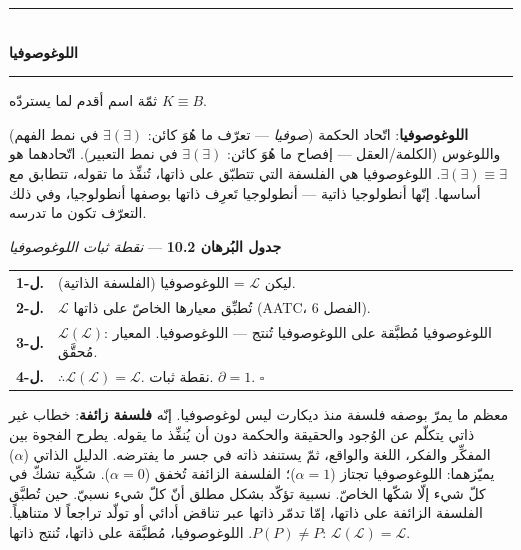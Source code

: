 \documentclass[10pt, openany, oneside]{book}
\renewcommand{\normalsize}{\fontsize{10}{13}\selectfont}
\renewcommand{\footnotesize}{\fontsize{8.5}{11}\selectfont}
\begin{document}
\begin{center}
    \rule{0.3\textwidth}{0.4pt}\\[0.5em]
    {\normalsize\bfseries اللوغوصوفيا}\\[0.3em]
    \rule{0.3\textwidth}{0.4pt}
\end{center}

\vspace{1em}

\noindent ثمّة اسم أقدم لما يستردّه $K \equiv B$.

\textbf{اللوغوصوفيا}: اتّحاد الحكمة (\textit{صوفيا} --- تعرّف ما هُوَ كائن: $\exists(\exists)$ في نمط الفهم) واللوغوس (الكلمة/العقل --- إفصاح ما هُوَ كائن: $\exists(\exists)$ في نمط التعبير). اتّحادهما هو $\exists(\exists) \equiv \exists$. اللوغوصوفيا هي الفلسفة التي تتطبّق على ذاتها، تُنفِّذ ما تقوله، تتطابق مع أساسها. إنّها أنطولوجيا ذاتية --- أنطولوجيا تَعرِف ذاتها بوصفها أنطولوجيا، وفي ذلك التعرّف تكون ما تدرسه.

\vspace{0.5em}

\textbf{جدول البُرهان 10.2} --- \textit{نقطة ثبات اللوغوصوفيا}

\vspace{0.5em}

{\footnotesize
\noindent\begin{tabular}{r p{}}
\textbf{ل-1.} & ليكن $\mathcal{L}$ = اللوغوصوفيا (الفلسفة الذاتية). \\[0.3em]
\textbf{ل-2.} & $\mathcal{L}$ تُطبِّق معيارها الخاصّ على ذاتها (AATC، الفصل 6). \\[0.3em]
\textbf{ل-3.} & $\mathcal{L}(\mathcal{L})$: اللوغوصوفيا مُطبَّقة على اللوغوصوفيا تُنتج --- اللوغوصوفيا. المعيار مُحقَّق. \\[0.3em]
\textbf{ل-4.} & $\therefore \mathcal{L}(\mathcal{L}) = \mathcal{L}$. نقطة ثبات. $\partial = 1$. $\square$ \\[0.3em]
\end{tabular}
}

\vspace{0.8em}

\noindent معظم ما يمرّ بوصفه فلسفة منذ ديكارت ليس لوغوصوفيا. إنّه \textbf{فلسفة زائفة}: خطاب غير ذاتي يتكلّم عن الوُجود والحقيقة والحكمة دون أن يُنفِّذ ما يقوله. يطرح الفجوة بين المفكِّر والفكر، اللغة والواقع، ثمّ يستنفد ذاته في جسر ما يفترضه. الدليل الذاتي ($\alpha$) يميّزهما: اللوغوصوفيا تجتاز ($\alpha = 1$)؛ الفلسفة الزائفة تُخفق ($\alpha = 0$). شكّية تشكّ في كلّ شيء إلّا شكّها الخاصّ. نسبية تؤكّد بشكل مطلق أنّ كلّ شيء نسبيّ. حين تُطبَّق الفلسفة الزائفة على ذاتها، إمّا تدمّر ذاتها عبر تناقض أدائي أو تولّد تراجعاً لا متناهياً. $P(P) \neq P$. اللوغوصوفيا، مُطبَّقة على ذاتها، تُنتج ذاتها: $\mathcal{L}(\mathcal{L}) = \mathcal{L}$.
\end{document}
